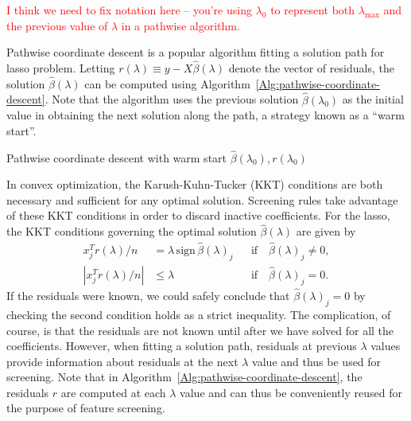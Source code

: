 \documentclass{article}
\providecommand{\sign}{\textrm{sign}}
\providecommand{\note}[1]{\textcolor{red}{#1}}
\providecommand{\lam}{\lambda}
\begin{document}
\note{I think we need to fix notation here -- you're using $\lam_0$ to represent both $\lam_{\max}$ and the previous value of $\lam$ in a pathwise algorithm.}

Pathwise coordinate descent is a popular algorithm fitting a solution path for lasso problem. Letting $r(\lambda) \equiv y-X\hat{\beta}(\lambda)$ denote the vector of residuals, the solution $\hat{\beta}(\lambda)$ can be computed using Algorithm~\ref{Alg:pathwise-coordinate-descent}.  Note that the algorithm uses the previous solution $\hat{\beta}(\lambda_0)$ as the initial value in obtaining the next solution along the path, a strategy known as a ``warm start''.

\begin{algorithm}[H]\label{Alg:pathwise-coordinate-descent}
    \SetAlgoLined
    \BlankLine
    \caption{Pathwise coordinate descent with warm start $\hat{\beta}(\lambda_0),r(\lambda_0)$}
\end{algorithm}

In convex optimization, the Karush-Kuhn-Tucker (KKT) conditions are both necessary and sufficient for any optimal solution.  Screening rules take advantage of these KKT conditions in order to discard inactive coefficients.  For the lasso, the KKT conditions governing the optimal solution $\hat{\beta}(\lambda)$ are given by
\begin{equation}
  \begin{aligned}
    x_j^Tr(\lambda)/n &= \lambda \, \sign \, \hat{\beta}(\lambda)_j & & \textrm{if} \quad \hat{\beta}(\lambda)_j\neq 0,\\
    |x_j^Tr(\lambda)/n| &\leq \lambda & & \textrm{if} \quad \hat{\beta}(\lambda)_j= 0.
  \end{aligned}
\end{equation}
If the residuals were known, we could safely conclude that $\hat{\beta}(\lambda)_j=0$ by checking the second condition holds as a strict inequality.  The complication, of course, is that the residuals are not known until after we have solved for all the coefficients.  However, when fitting a solution path, residuals at previous $\lambda$ values provide information about residuals at the next $\lambda$ value and thus be used for screening.  Note that in Algorithm~\ref{Alg:pathwise-coordinate-descent}, the residuals $r$ are computed at each $\lambda$ value and can thus be conveniently reused for the purpose of feature screening.
\end{document}
